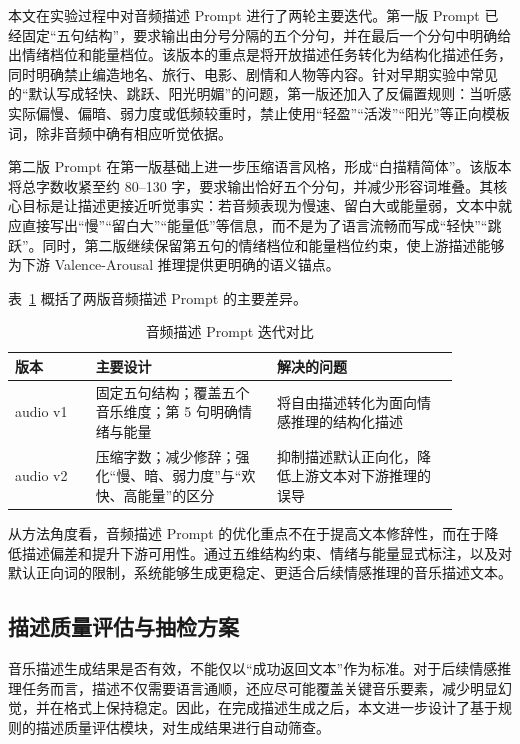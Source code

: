 本文在实验过程中对音频描述 Prompt 进行了两轮主要迭代。第一版 Prompt 已经固定“五句结构”，要求输出由分号分隔的五个分句，并在最后一个分句中明确给出情绪档位和能量档位。该版本的重点是将开放描述任务转化为结构化描述任务，同时明确禁止编造地名、旅行、电影、剧情和人物等内容。针对早期实验中常见的“默认写成轻快、跳跃、阳光明媚”的问题，第一版还加入了反偏置规则：当听感实际偏慢、偏暗、弱力度或低频较重时，禁止使用“轻盈”“活泼”“阳光”等正向模板词，除非音频中确有相应听觉依据。

第二版 Prompt 在第一版基础上进一步压缩语言风格，形成“白描精简体”。该版本将总字数收紧至约 80--130 字，要求输出恰好五个分句，并减少形容词堆叠。其核心目标是让描述更接近听觉事实：若音频表现为慢速、留白大或能量弱，文本中就应直接写出“慢”“留白大”“能量低”等信息，而不是为了语言流畅而写成“轻快”“跳跃”。同时，第二版继续保留第五句的情绪档位和能量档位约束，使上游描述能够为下游 Valence-Arousal 推理提供更明确的语义锚点。

表~\ref{tab:audio-prompt-iter} 概括了两版音频描述 Prompt 的主要差异。

\begin{table}[htbp]
  \centering
  \caption{音频描述 Prompt 迭代对比}
  \label{tab:audio-prompt-iter}
  \begin{tabular}{p{0.16\linewidth}p{0.36\linewidth}p{0.36\linewidth}}
    \hline
    版本 & 主要设计 & 解决的问题 \\
    \hline
    audio v1 & 固定五句结构；覆盖五个音乐维度；第 5 句明确情绪与能量 & 将自由描述转化为面向情感推理的结构化描述 \\
    audio v2 & 压缩字数；减少修辞；强化“慢、暗、弱力度”与“欢快、高能量”的区分 & 抑制描述默认正向化，降低上游文本对下游推理的误导 \\
    \hline
  \end{tabular}
\end{table}

从方法角度看，音频描述 Prompt 的优化重点不在于提高文本修辞性，而在于降低描述偏差和提升下游可用性。通过五维结构约束、情绪与能量显式标注，以及对默认正向词的限制，系统能够生成更稳定、更适合后续情感推理的音乐描述文本。

\subsection{描述质量评估与抽检方案}

音乐描述生成结果是否有效，不能仅以“成功返回文本”作为标准。对于后续情感推理任务而言，描述不仅需要语言通顺，还应尽可能覆盖关键音乐要素，减少明显幻觉，并在格式上保持稳定。因此，在完成描述生成之后，本文进一步设计了基于规则的描述质量评估模块，对生成结果进行自动筛查。

